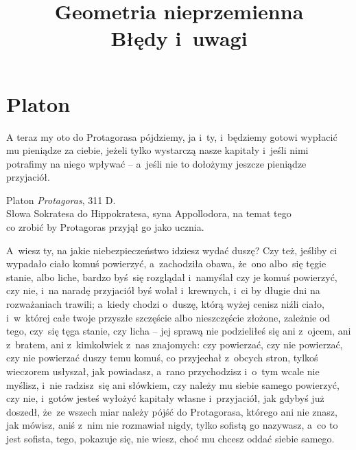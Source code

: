 \documentclass[a4paper,11pt]{article}
\title{Geometria nieprzemienna \\
  Błędy i~uwagi}
\newcommand{\attribA}[1]{#1}
\begin{document}





\maketitle %





\section{Platon}





\noindent
A teraz my oto do Protagorasa pójdziemy, ja i~ty, i~będziemy gotowi
wypłacić mu pieniądze za ciebie, jeżeli tylko wystarczą nasze kapitały
i~jeśli nimi potrafimy na niego wpływać -- a~jeśli nie to dołożymy
jeszcze pieniądze przyjaciół.


\attribA{Platon \textit{Protagoras}, 311 D. \\
  Słowa Sokratesa do Hippokratesa, syna Appollodora, na temat tego \\
  co zrobić by Protagoras przyjął go jako ucznia.}

\vspace{\spaceThree}



\noindent
A~wiesz ty, na jakie niebezpieczeństwo idziesz wydać duszę? Czy też,
jeśliby ci wypadało ciało komuś powierzyć, a~zachodziła obawa, że~ono
albo~się tęgie stanie, albo liche, bardzo byś~się rozglądał i~namyślał
czy je komuś powierzyć, czy nie, i~na naradę przyjaciół byś wołał
i~krewnych, i~ci by długie dni na rozważaniach trawili; a~kiedy chodzi
o~duszę, którą wyżej cenisz niźli ciało, i~w~której całe twoje
przyszłe szczęście albo nieszczęście złożone, zależnie od tego,
czy~się tęga stanie, czy licha -- jej sprawą nie podzieliłeś się ani
z~ojcem, ani z~bratem, ani z~kimkolwiek z~nas znajomych: czy
powierzać, czy nie powierzać, czy nie powierzać duszy temu komuś, co
przyjechał z~obcych stron, tylkoś wieczorem usłyszał, jak powiadasz,
a~rano przychodzisz i~o~tym wcale nie myślisz, i~nie radzisz~się ani
słówkiem, czy należy mu siebie samego powierzyć, czy nie, i~gotów
jesteś wyłożyć kapitały własne i~przyjaciół, jak gdybyś już doszedł,
że~ze wszech miar należy pójść do Protagorasa, którego ani nie znasz,
jak mówisz, aniś z~nim nie rozmawiał nigdy, tylko sofistą go nazywasz,
a~co to jest sofista, tego, pokazuje się, nie wiesz, choć mu chcesz
oddać siebie samego.
\end{document}
